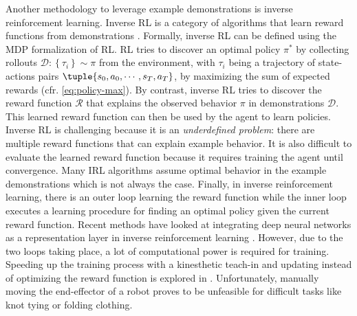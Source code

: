 \documentclass[\home/main.tex]{subfiles}
\begin{document}
Another methodology to leverage example demonstrations is inverse reinforcement learning. Inverse RL is a category of algorithms that learn reward functions from demonstrations \autocite{Ng2000}. Formally, inverse RL can be defined using the \gls{MDP} formalization of RL. RL tries to discover an optimal policy $\pi^*$ by collecting rollouts $\mathcal{D}:\left\{\tau_{i}\right\} \sim \pi$ from the environment, with $\tau_{i}$ being a trajectory of state-actions pairs $\tuple{s_0, a_0, \cdots, s_T, a_T}$, by maximizing the sum of expected rewards (cfr. \cref{eq:policy-max}). By contrast, inverse RL tries to discover the reward function $\mathcal{R}$ that explains the observed behavior $\pi$ in demonstrations $\mathcal{D}$. This learned reward function can then be used by the agent to learn policies. Inverse RL is challenging because it is an \emph{underdefined problem}: there are multiple reward functions that can explain example behavior. It is also difficult to evaluate the learned reward function because it requires training the agent until convergence. Many IRL algorithms assume optimal behavior in the example demonstrations which is not always the case. Finally, in inverse reinforcement learning, there is an outer loop learning the reward function while the inner loop executes a learning procedure for finding an optimal policy given the current reward function. Recent methods have looked at integrating deep neural networks as a representation layer in inverse reinforcement learning \autocite{Finn2016,Ho2016,Fu2018}. However, due to the two loops taking place, a lot of computational power is required for training. Speeding up the training process with a kinesthetic teach-in and updating instead of optimizing the reward function is explored in \autocite{Finn2016}. Unfortunately, manually moving the end-effector of a robot proves to be unfeasible for difficult tasks like knot tying or folding clothing.
\end{document}
